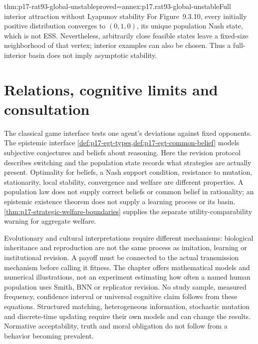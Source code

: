 \begin{hbtheorem}{thm:p17-rat93-global-unstable}{proved=annex:p17.rat93-global-unstable}{Full interior attraction without Lyapunov stability}
For Figure~9.3.10, every initially positive distribution converges to
\((0,1,0)\), its unique population Nash state, which is not ESS.
Nevertheless, arbitrarily close feasible states leave
a fixed-size neighborhood of that vertex; interior examples can also
be chosen. Thus a full-interior basin does not imply asymptotic stability.
\end{hbtheorem}

\section{Relations, cognitive limits and consultation}
\label{sec:p17-rat93-consultation}

The classical game interface tests one agent's deviations against fixed
opponents. The epistemic interface
\cref{def:p17-egt-types,def:p17-egt-common-belief}
models subjective conjectures and beliefs about reasoning. Here the
revision protocol describes switching and the population state records
what strategies are actually present. Optimality for beliefs, a Nash
support condition, resistance to mutation, stationarity, local stability,
convergence and welfare are different properties. A population law does
not supply correct beliefs or common belief in rationality; an epistemic
existence theorem does not supply a learning process or its basin.
\cref{thm:p17-strategic-welfare-boundaries} supplies the separate
utility-comparability warning for aggregate welfare.

Evolutionary and cultural interpretations require different mechanisms:
biological inheritance and reproduction are not the same process as
imitation, learning or institutional revision. A payoff must be connected
to the actual transmission mechanism before calling it fitness. The
chapter offers mathematical models and numerical illustrations, not an
experiment estimating how often a named human population uses Smith,
BNN or replicator revision. No study sample, measured frequency,
confidence interval or universal cognitive claim follows from these
equations. Structured matching, heterogeneous information, stochastic
mutation and discrete-time updating require their own models and can
change the results. Normative acceptability, truth and moral obligation
do not follow from a behavior becoming prevalent.
\cite[Secs.~1, 4--5, pp.~553--554, 556--564]{Alexander2021EvolutionaryGames}


